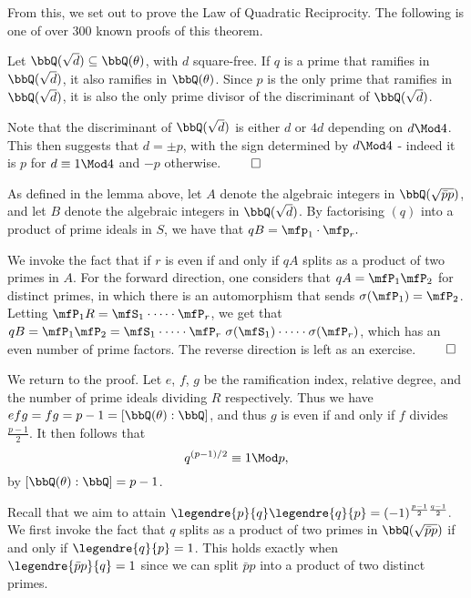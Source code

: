 \documentclass[a4paper, 12pt,oneside,openany]{book}
\begin{document}
From this, we set out to prove the Law of Quadratic Reciprocity. The following is one of over 300 known proofs of this theorem.


 Let $\bbQ(\sqrt{d}) \subseteq \bbQ(\theta)$, with $d$ square-free. If $q$ is a prime that ramifies in $\bbQ(\sqrt{d})$, it also ramifies in $\bbQ(\theta)$. Since $p$ is the only prime that ramifies in $\bbQ(\sqrt{d})$, it is also the only prime divisor of the discriminant of $\bbQ(\sqrt{d})$. 

Note that the discriminant of $\bbQ(\sqrt{d})$ is either $d$ or $4d$ depending on $d \Mod 4$. This then suggests that $d = \pm p$, with the sign determined by $d\Mod4$ - indeed it is $p$ for $d\equiv 1 \Mod 4$ and $-p$ otherwise.  $\qed$


 As defined in the lemma above, let $A$ denote the algebraic integers in $\bbQ(\sqrt{\bar{p}p})$, and let $B$ denote the algebraic integers in $\bbQ(\sqrt{d})$. By factorising $(q)$ into a product of prime ideals in $S$, we have that $qB=\mfp_1\cdot \mfp_r.$ 

We invoke the fact that if $r$ is even if and only if $qA$ splits as a product of two primes in $A$. For the forward direction, one considers that $qA=\mfP_1\mfP_2$ for distinct primes, in which there is an automorphism that sends $\sigma(\mfP_1)=\mfP_2$. Letting $\mfP_1R=\mfS_1\cdot\dots\cdot \mfP_r$, we get that $qB=\mfP_1\mfP_2=\mfS_1\cdot\dots\cdot \mfP_r\ \sigma(\mfS_1)\cdot\dots\cdot \sigma(\mfP_r)$, which has an even number of prime factors. The reverse direction is left as an exercise. $\qed$

We return to the proof. Let $e$, $f$, $g$ be the ramification index, relative degree, and the number of prime ideals dividing $R$ respectively. Thus we have $efg = fg = p-1 = [\bbQ(\theta):\bbQ]$, and thus $g$ is even if and only if $f$ divides $\frac{p-1}{2}$. It then follows that $$q^{(p-1)/2}\equiv 1 \Mod p,$$ by $[\bbQ(\theta):\bbQ]=p-1$.

Recall that we aim to attain $\legendre{p}{q}\legendre{q}{p}=(-1)^{\frac{p-1}{2}\frac{q-1}{2}}.$ We first invoke the fact that $q$ splits as a product of two primes in $\bbQ(\sqrt{\bar{p}p})$ if and only if $\legendre{q}{p}=1$. This holds exactly when $\legendre{\bar{p}p}{q}=1$ since we can split $\bar{p}p$ into a product of two distinct primes. 
\end{document}
